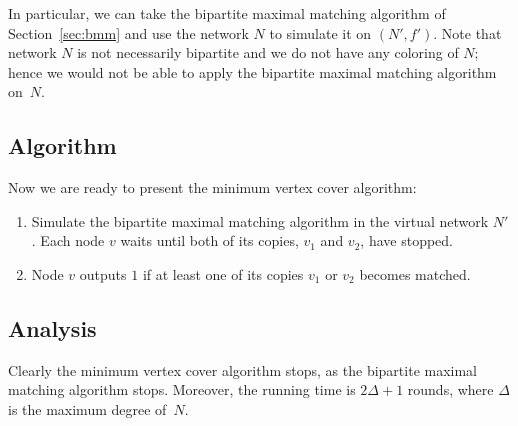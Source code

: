 In particular, we can take the bipartite maximal matching algorithm of Section~\ref{sec:bmm} and use the network $N$ to simulate it on $(N'\!,f')$. Note that network $N$ is not necessarily bipartite and we do not have any coloring of $N$; hence we would not be able to apply the bipartite maximal matching algorithm on~$N$.


\subsection{Algorithm}

Now we are ready to present the minimum vertex cover  algorithm:
\begin{enumerate}
    \item Simulate the bipartite maximal matching algorithm in the virtual network $N'$. Each node $v$ waits until both of its copies, $v_1$ and $v_2$, have stopped.
    \item Node $v$ outputs $1$ if at least one of its copies $v_1$ or $v_2$ becomes matched.
\end{enumerate}


\subsection{Analysis}

Clearly the minimum vertex cover  algorithm stops, as the bipartite maximal matching algorithm stops. Moreover, the running time is $2\Delta+1$ rounds, where $\Delta$ is the maximum degree of~$N$.

